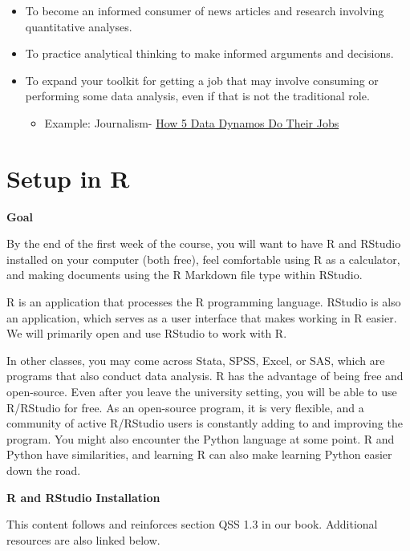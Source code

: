 \documentclass[
  letterpaper,
  DIV=11,
  numbers=noendperiod]{scrreprt}
\providecommand{\tightlist}{%
  \setlength{\itemsep}{0pt}\setlength{\parskip}{0pt}}\usepackage{longtable,booktabs,array}
\begin{document}
\begin{itemize}
\tightlist
\item
  To become an informed consumer of news articles and research involving
  quantitative analyses.
\item
  To practice analytical thinking to make informed arguments and
  decisions.
\item
  To expand your toolkit for getting a job that may involve consuming or
  performing some data analysis, even if that is not the traditional
  role.

  \begin{itemize}
  \tightlist
  \item
    Example: Journalism-
    \href{https://www.nytimes.com/2019/06/12/reader-center/data-reporting-spreadsheets.html}{How
    5 Data Dynamos Do Their Jobs}
  \end{itemize}
\end{itemize}

\hypertarget{rsetup}{%
\section{Setup in R}\label{rsetup}}

\textbf{Goal}

By the end of the first week of the course, you will want to have R and
RStudio installed on your computer (both free), feel comfortable using R
as a calculator, and making documents using the R Markdown file type
within RStudio.

R is an application that processes the R programming language. RStudio
is also an application, which serves as a user interface that makes
working in R easier. We will primarily open and use RStudio to work with
R.

In other classes, you may come across Stata, SPSS, Excel, or SAS, which
are programs that also conduct data analysis. R has the advantage of
being free and open-source. Even after you leave the university setting,
you will be able to use R/RStudio for free. As an open-source program,
it is very flexible, and a community of active R/RStudio users is
constantly adding to and improving the program. You might also encounter
the Python language at some point. R and Python have similarities, and
learning R can also make learning Python easier down the road.

\textbf{R and RStudio Installation}

This content follows and reinforces section QSS 1.3 in our book.
Additional resources are also linked below.
\end{document}
